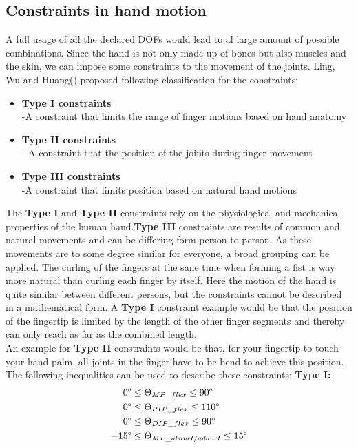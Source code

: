 \subsection{Constraints in hand motion}
A full usage of all the declared DOFs would lead to al large amount of possible combinations. Since the hand is not only made up of bones but also muscles and the skin, we can impose some constraints \cite{Badler.1987,Pavlovic.1997} to the movement of the joints. Ling, Wu and Huang(\cite{LIN.2000}) proposed following classification for the constraints:
\newpage
\begin{itemize}
\item \textbf{Type I constraints}\\
	-A constraint that limits the range of finger motions based on hand anatomy
	\item \textbf{Type II constraints}\\
	- A constraint that the position of the joints during finger movement
	\item \textbf{Type III constraints\\}
	-A constraint that limits position based on natural hand motions
\end{itemize} 
The \textbf{Type I} and \textbf{Type II} constraints rely on the physiological and mechanical properties of the human hand.\textbf{Type III} constraints are results of common and natural
movements and can be differing form person to person. As these movements are to some degree similar for everyone, a broad grouping can be applied. The curling of the fingers at the sane time when forming a fist is way more natural than curling each finger by itself. Here the motion of the hand is quite similar between different persons, but the constraints cannot be described in a mathematical form. 
 A \textbf{Type I} constraint example would be that the position of the fingertip is limited by the length of the other finger segments and thereby can only reach as far as the combined length.\\An example for \textbf{Type II} constraints would be that, for your fingertip to touch your hand palm, all joints in the finger have to be bend to achieve this position.
The following inequalities can be used to describe these constraints:
\textbf{Type I:}
\begin{equation}
\begin{split}
0\degree&\leq \Theta _{MP\_flex} \leq 90\degree\\
0\degree&\leq \Theta _{PIP\_flex} \leq 110\degree\\
0\degree&\leq \Theta _{DIP\_flex} \leq 90\degree\\
-15\degree&\leq \Theta _{MP\_abduct/adduct} \leq 15\degree
\end{split}
\end{equation}
